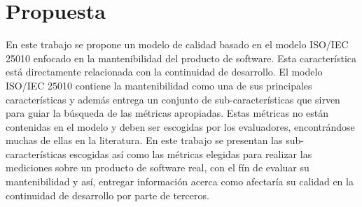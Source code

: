 
\section{Propuesta}
En este trabajo se propone un modelo de calidad basado en el modelo ISO/IEC 25010
enfocado en la mantenibilidad del producto de software. Esta característica está
directamente relacionada con la continuidad de desarrollo.
El modelo ISO/IEC 25010 contiene la mantenibilidad como una de sus principales
características y además entrega un conjunto de sub-características que sirven para
guiar la búsqueda de las métricas apropiadas.
Estas métricas no están contenidas en el modelo y deben ser escogidas por los evaluadores, 
encontrándose muchas de ellas en la literatura.
En este trabajo se presentan las sub-características escogidas así como las 
métricas elegidas para realizar las mediciones sobre un producto de software real, 
con el fín de evaluar su mantenibilidad y así, entregar información acerca como afectaría
su calidad en la continuidad de desarrollo por parte de terceros.
